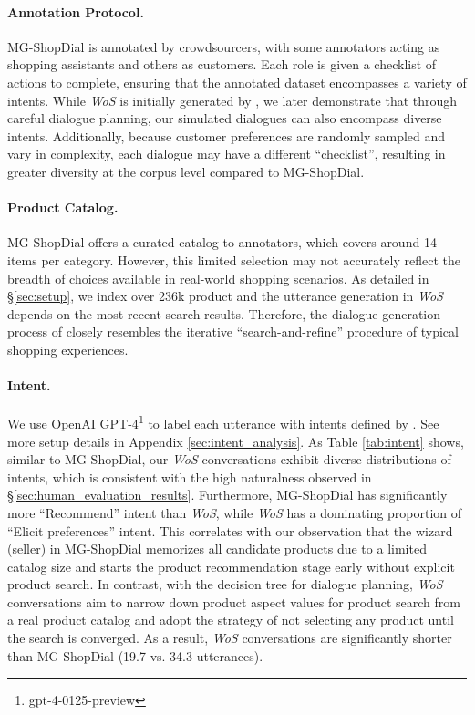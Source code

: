 \paragraph{Annotation Protocol.} MG-ShopDial is annotated by crowdsourcers, with some annotators acting as shopping assistants and others as customers. Each role is given a checklist of actions to complete, ensuring that the annotated dataset encompasses a variety of intents. While \textit{WoS} is initially generated by \method, we later demonstrate that through careful dialogue planning, our simulated dialogues can also encompass diverse intents. Additionally, because customer preferences are randomly sampled and vary in complexity, each dialogue may have a different ``checklist'', resulting in greater diversity at the corpus level compared to MG-ShopDial.
\vspace{-0.5em}
\paragraph{Product Catalog.} MG-ShopDial offers a curated catalog to annotators, which covers around 14 items per category. However, this limited selection may not accurately reflect the breadth of choices available in real-world shopping scenarios. As detailed in \S\ref{sec:setup}, we index over 236k product and the utterance generation in \textit{WoS} depends on the most recent search results. Therefore, the dialogue generation process of \method closely resembles the iterative ``search-and-refine'' procedure of typical shopping experiences.
\vspace{-0.5em}
\paragraph{Intent.} We use OpenAI GPT-4\footnote{gpt-4-0125-preview} to label each utterance with intents defined by \citet{Bernard:2023:SIGIR}. See more setup details in Appendix \ref{sec:intent_analysis}. As Table \ref{tab:intent} shows, similar to MG-ShopDial, our \textit{WoS} conversations exhibit diverse distributions of intents, which is consistent with the high naturalness observed in \S\ref{sec:human_evaluation_results}. Furthermore, MG-ShopDial has significantly more ``Recommend'' intent than \textit{WoS}, while \textit{WoS} has a dominating proportion of ``Elicit preferences'' intent. This correlates with our observation that the wizard (seller) in MG-ShopDial memorizes all candidate products due to a limited catalog size and starts the product recommendation stage early without explicit product search. In contrast, with the decision tree for dialogue planning, \textit{WoS} conversations aim to narrow down product aspect values for product search from a real product catalog and adopt the strategy of not selecting any product until the search is converged. As a result, \textit{WoS} conversations are significantly shorter than MG-ShopDial (19.7 vs. 34.3 utterances).



